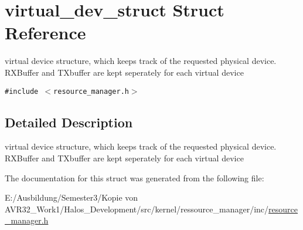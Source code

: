 \hypertarget{structvirtual__dev__struct}{
\section{virtual\_\-dev\_\-struct Struct Reference}
\label{structvirtual__dev__struct}
}
virtual device structure, which keeps track of the requested physical device. RXBuffer and TXbuffer are kept seperately for each virtual device  


{\tt \#include $<$resource\_\-manager.h$>$}



\subsection{Detailed Description}
virtual device structure, which keeps track of the requested physical device. RXBuffer and TXbuffer are kept seperately for each virtual device 

The documentation for this struct was generated from the following file:\begin{CompactItemize}
\item 
E:/Ausbildung/Semester3/Kopie von AVR32\_\-Work1/Halos\_\-Development/src/kernel/ressource\_\-manager/inc/\hyperlink{resource__manager_8h}{resource\_\-manager.h}\end{CompactItemize}

